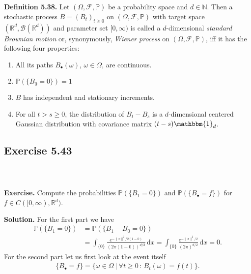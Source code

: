 \documentclass{beamer}
\numberwithin{equation}{section}
\newcommand{\task}[1]{
    \begin{center}
        \colorbox{red}{
            \textsf{
                \textbf{#1}
            }
        }
    \end{center}
}
\newenvironment{frame2}{\begin{frame}\frametitle{{\normalsize \secname} \\ {\large \subsecname}}}{\end{frame}}
\begin{document}
\begin{frame2}
    \textbf{Definition 5.38.} Let $(\Omega,\mathcal{F},\mathbb{P})$ be a probability space and $d\in\mathbb{N}$.
    Then a stochastic process $B = (B_t)_{t\geq 0}$ on $(\Omega,\mathcal{F},\mathbb{P})$ with target space $(\mathbb{R}^d,\mathcal{B}(\mathbb{R}^d))$ and parameter set $[0,\infty)$ is called a $d$-dimensional \textit{standard Brownian motion} or, synonymously, \textit{Wiener process} on $(\Omega,\mathcal{F},\mathbb{P})$, iff it has the following four properties:
    \begin{enumerate}
        \item All its paths $B_\bullet(\omega)$, $\omega \in \Omega$, are continuous.
        \item $\mathbb{P}(\{B_0 = 0\})=1$ %
        \item $B$ has independent and stationary increments.
        \item For all $t > s \geq 0$, the distribution of $B_t - B_s$ is a $d$-dimensional centered Gaussian distribution with covariance matrix $(t-s)\mathbbm{1}_d$. %
    \end{enumerate}
\end{frame2}

\subsection{Exercise 5.43}

\begin{frame2}
    \textbf{Exercise.} Compute the probabilities $\mathbb{P}(\{B_1 = 0\})$ and $\mathbb{P}(\{B_\bullet = f\})$ for $f \in C([0,\infty),\mathbb{R}^d)$.

    \vspace{10pt}
    \textbf{Solution.} 
    For the first part we have
    \begin{align*}
        \mathbb{P}(\{B_1 = 0\}) &= \mathbb{P}(\{B_1 - B_0 = 0\}) \\
        &= \int_{\{0\}} \frac{e^{-\|x\|^2/2(1-0)}}{(2\pi(1 - 0))^{d/2}}\,\text{d}x = \int_{\{0\}} \frac{e^{-\|x\|^2/2}}{(2\pi)^{d/2}}\,\text{d}x = 0.
    \end{align*}
    For the second part let us first look at the event itself
    \begin{align}
        \{B_\bullet = f\} = \{\omega \in \Omega \ | \ \forall t\geq 0\,:\, B_t(\omega) = f(t)\}.
    \end{align}
\end{frame2}
\end{document}
